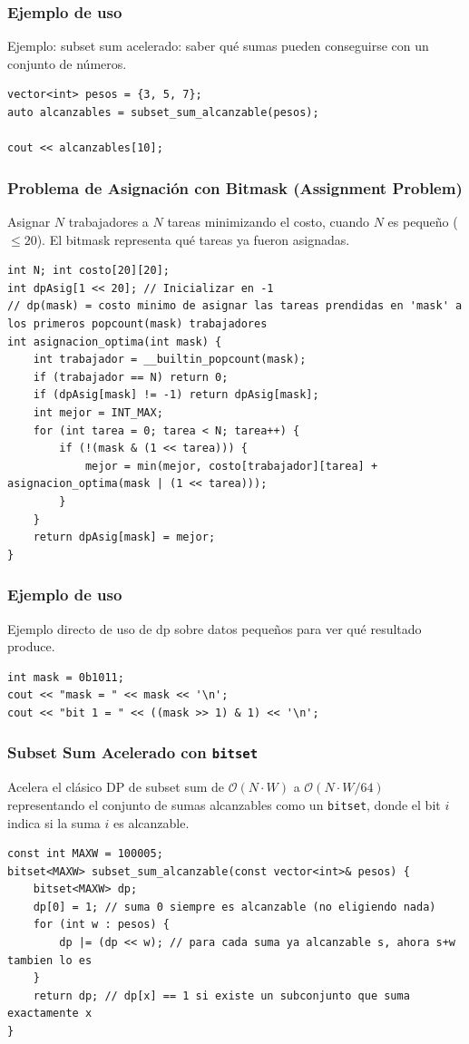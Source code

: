 \documentclass[10pt,twocolumn,letterpaper]{report}
\begin{document}
\subsubsection*{Ejemplo de uso}
Ejemplo: subset sum acelerado: saber qué sumas pueden conseguirse con un conjunto de números.
\begin{lstlisting}
vector<int> pesos = {3, 5, 7};
auto alcanzables = subset_sum_alcanzable(pesos);

cout << alcanzables[10];
\end{lstlisting}

\subsubsection{Problema de Asignación con Bitmask (Assignment Problem)}
Asignar $N$ trabajadores a $N$ tareas minimizando el costo, cuando $N$ es pequeño ($\leq 20$). El bitmask representa qué tareas ya fueron asignadas.
\begin{lstlisting}
int N; int costo[20][20];
int dpAsig[1 << 20]; // Inicializar en -1
// dp(mask) = costo minimo de asignar las tareas prendidas en 'mask' a los primeros popcount(mask) trabajadores
int asignacion_optima(int mask) {
    int trabajador = __builtin_popcount(mask);
    if (trabajador == N) return 0;
    if (dpAsig[mask] != -1) return dpAsig[mask];
    int mejor = INT_MAX;
    for (int tarea = 0; tarea < N; tarea++) {
        if (!(mask & (1 << tarea))) {
            mejor = min(mejor, costo[trabajador][tarea] + asignacion_optima(mask | (1 << tarea)));
        }
    }
    return dpAsig[mask] = mejor;
}
\end{lstlisting}
\subsubsection*{Ejemplo de uso}
Ejemplo directo de uso de dp sobre datos pequeños para ver qué resultado produce.
\begin{lstlisting}
int mask = 0b1011;
cout << "mask = " << mask << '\n';
cout << "bit 1 = " << ((mask >> 1) & 1) << '\n';
\end{lstlisting}

\subsubsection{Subset Sum Acelerado con \texttt{bitset}}
Acelera el clásico DP de subset sum de $\mathcal{O}(N \cdot W)$ a $\mathcal{O}(N \cdot W / 64)$ representando el conjunto de sumas alcanzables como un \texttt{bitset}, donde el bit $i$ indica si la suma $i$ es alcanzable.
\begin{lstlisting}
const int MAXW = 100005;
bitset<MAXW> subset_sum_alcanzable(const vector<int>& pesos) {
    bitset<MAXW> dp;
    dp[0] = 1; // suma 0 siempre es alcanzable (no eligiendo nada)
    for (int w : pesos) {
        dp |= (dp << w); // para cada suma ya alcanzable s, ahora s+w tambien lo es
    }
    return dp; // dp[x] == 1 si existe un subconjunto que suma exactamente x
}
\end{lstlisting}
\end{document}
